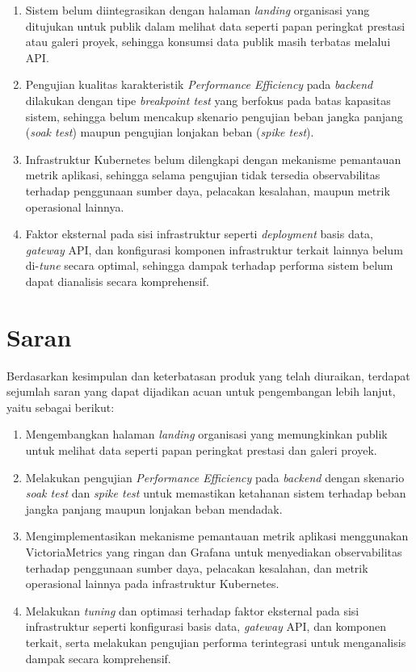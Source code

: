 \begin{enumerate}[label=\alph*.]
    \item Sistem belum diintegrasikan dengan halaman \textit{landing} organisasi yang ditujukan untuk publik dalam melihat data seperti papan peringkat prestasi atau galeri proyek, sehingga konsumsi data publik masih terbatas melalui API.
    \item Pengujian kualitas karakteristik \textit{Performance Efficiency} pada \textit{backend} dilakukan dengan tipe \textit{breakpoint test} yang berfokus pada batas kapasitas sistem, sehingga belum mencakup skenario pengujian beban jangka panjang (\textit{soak test}) maupun pengujian lonjakan beban (\textit{spike test}).
    \item Infrastruktur Kubernetes belum dilengkapi dengan mekanisme pemantauan metrik aplikasi, sehingga selama pengujian tidak tersedia observabilitas terhadap penggunaan sumber daya, pelacakan kesalahan, maupun metrik operasional lainnya.
    \item Faktor eksternal pada sisi infrastruktur seperti \textit{deployment} basis data, \textit{gateway} API, dan konfigurasi komponen infrastruktur terkait lainnya belum di-\textit{tune} secara optimal, sehingga dampak terhadap performa sistem belum dapat dianalisis secara komprehensif.
\end{enumerate}

\section{Saran}

Berdasarkan kesimpulan dan keterbatasan produk yang telah diuraikan, terdapat sejumlah saran yang dapat dijadikan acuan untuk pengembangan lebih lanjut, yaitu sebagai berikut:

\begin{enumerate}
    \item Mengembangkan halaman \textit{landing} organisasi yang memungkinkan publik untuk melihat data seperti papan peringkat prestasi dan galeri proyek.
    \item Melakukan pengujian \textit{Performance Efficiency} pada \textit{backend} dengan skenario \textit{soak test} dan \textit{spike test} untuk memastikan ketahanan sistem terhadap beban jangka panjang maupun lonjakan beban mendadak.
    \item Mengimplementasikan mekanisme pemantauan metrik aplikasi menggunakan VictoriaMetrics yang ringan dan Grafana untuk menyediakan observabilitas terhadap penggunaan sumber daya, pelacakan kesalahan, dan metrik operasional lainnya pada infrastruktur Kubernetes.
    \item Melakukan \textit{tuning} dan optimasi terhadap faktor eksternal pada sisi infrastruktur seperti konfigurasi basis data, \textit{gateway} API, dan komponen terkait, serta melakukan pengujian performa terintegrasi untuk menganalisis dampak secara komprehensif.
\end{enumerate}